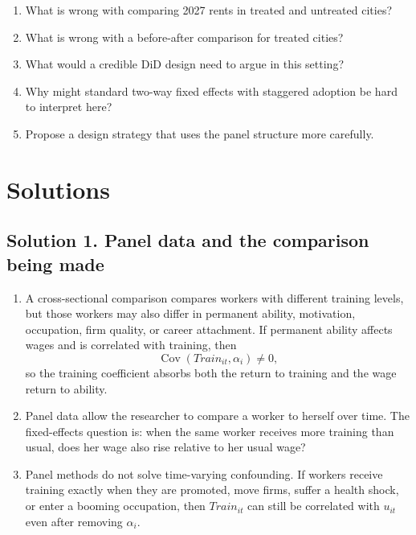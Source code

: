 \documentclass[11pt]{article}
\DeclareMathOperator{\Cov}{Cov}
\begin{document}
\begin{enumerate}[label=(\alph*)]
\item What is wrong with comparing 2027 rents in treated and untreated cities?
\item What is wrong with a before-after comparison for treated cities?
\item What would a credible DiD design need to argue in this setting?
\item Why might standard two-way fixed effects with staggered adoption be hard to interpret here?
\item Propose a design strategy that uses the panel structure more carefully.
\end{enumerate}

\newpage
\section*{Solutions}

\subsection*{Solution 1. Panel data and the comparison being made}

\begin{solutionbox}
\begin{enumerate}[label=(\alph*)]
\item A cross-sectional comparison compares workers with different training levels, but those workers may also differ in permanent ability, motivation, occupation, firm quality, or career attachment. If permanent ability affects wages and is correlated with training, then
\[
\Cov(Train_{it},\alpha_i)\neq 0,
\]
so the training coefficient absorbs both the return to training and the wage return to ability.

\item Panel data allow the researcher to compare a worker to herself over time. The fixed-effects question is: when the same worker receives more training than usual, does her wage also rise relative to her usual wage?

\item Panel methods do not solve time-varying confounding. If workers receive training exactly when they are promoted, move firms, suffer a health shock, or enter a booming occupation, then $Train_{it}$ can still be correlated with $u_{it}$ even after removing $\alpha_i$.
\end{enumerate}
\end{solutionbox}
\end{document}
